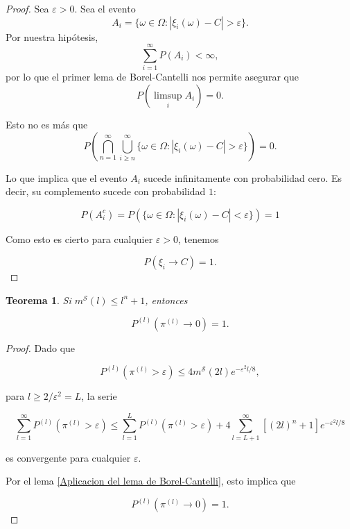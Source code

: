 \documentclass{report}
\newtheorem{thm}{Teorema}[section]
\begin{document}
\begin{proof}
    Sea $\varepsilon > 0$. Sea el evento
    \[
        A_i = \{ \omega \in \Omega : |\xi_i(\omega)-C| > \varepsilon\}.
    \]
Por nuestra hipótesis,
\[
    \sum_{i=1}^{\infty}P(A_i) < \infty,
\]
por lo que el primer lema de Borel-Cantelli nos permite asegurar que
\[
    P\left( \limsup_i A_i \right) = 0.
\]

Esto no es más que
\[
P\left( \bigcap_{n=1}^{\infty} \bigcup_{i\geq n}^{\infty} \{ \omega \in \Omega : |\xi_i(\omega)-C| > \varepsilon\} \right) = 0.
\]

Lo que implica que el evento $A_i$ sucede infinitamente con probabilidad cero. Es decir, su complemento sucede con probabilidad $1$:

\[
P(A_i^c) = P(\{ \omega \in \Omega : |\xi_i(\omega)-C| < \varepsilon\}) = 1
\]

Como esto es cierto para cualquier $\varepsilon > 0$, tenemos

\[P(\xi_i \to C) = 1.\]

\end{proof}

\begin{thm}
    Si \( m^{\mathcal{S}}(l) \leq l^n + 1 \), entonces  

    \[
    P^{(l)}(\pi^{(l)} \to 0) = 1.
    \]
    
\end{thm} 

\begin{proof}

Dado que  

\[
P^{(l)}(\pi^{(l)} > \varepsilon) \leq 4 m^{\mathcal{S}}(2l)  e^{-\varepsilon^2 l/8},
\]

para \( l \geq 2 / \varepsilon^2 =L \), la serie  

\[
\sum_{l=1}^{\infty} P^{(l)}(\pi^{(l)} > \varepsilon) \leq \sum_{l=1}^{L} P^{(l)}(\pi^{(l)} > \varepsilon) + 4 \sum_{l=L+1}^{\infty} [(2l)^n + 1] e^{-\varepsilon^2 l/8}
\]

es convergente para cualquier \( \varepsilon \).  \newline

Por el lema \ref{Aplicacion del lema de Borel-Cantelli}, esto implica que  

\[
P^{(l)}(\pi^{(l)} \to 0) = 1.
\]
\end{proof}
\end{document}
